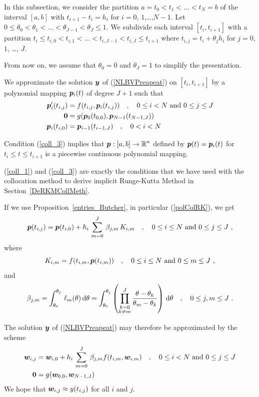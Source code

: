 In this subsection, we consider the partition
$a = t_0 < t_1 < \ldots < t_N = b$ of the interval $[a,b]$ with
$t_{i+1}-t_i = h_i$ for $i=0$, $1$,\ldots,$N-1$.  Let
$0 \leq \theta_0 < \theta_1 < \ldots < \theta_{J-1} < \theta_J
\leq 1$.  We subdivide each interval
$[t_i,t_{i+1}]$ with a partition
$t_i \leq t_{i,0} < t_{i,1} < \ldots < t_{i,J-1} < t_{i,J} \leq t_{i+1}$
where $t_{i,j} = t_i + \theta_jh_i$ for $j=0$, $1$, \ldots, $J$.

From now on, we assume that $\theta_0=0$ and $\theta_J=1$ to
simplify the presentation.

We approximate the solution $\bm{y}$ of (\ref{NLBVPreapeat}) on
$[t_i,t_{i+1}]$ by a polynomial mapping $\bm{p}_i(t)$ of degree
$J+1$ such that
\begin{align}
\bm{p}_i'(t_{i,j}) &= f(t_{i,j},\bm{p}_i(t_{i,j})) \quad ,
\quad 0 \leq i < N \ \text{and}\ 0 \leq j \leq J \label{coll_1} \\
\bm{0} &= g(\bm{p}_0(t_{0,0}),\bm{p}_{N-1}(t_{N-1,J})) \label{coll_2} \\
\bm{p}_i(t_{i,0}) &= \bm{p}_{i-1}(t_{i-1,J}) \quad , \quad
0 < i < N \label{coll_3}
\end{align}

Condition (\ref{coll_3}) implies that
$\displaystyle \bm{p}:[a,b]\to \mathbb{R}^n$ defined by
$\bm{p}(t) = \bm{p}_i(t)$ for $t_i \leq t \leq t_{i+1}$ is a
piecewise continuous polynomial mapping.

(\ref{coll_1}) and (\ref{coll_3}) are exactly the conditions that we
have used with the collocation method to derive implicit Runge-Kutta
Method in Section~\ref{DeRKMCollMeth}.

If we use Proposition~\ref{entries_Butcher}, in particular
(\ref{polColRK}), we get
\[
\VEC{p}(t_{i,j}) = \VEC{p}(t_{i,0}) + h_i\,\sum_{m=0}^J\, \beta_{j,m}\,K_{i,m}
\quad , \quad 0 \leq i \leq N \ \text{and} \ 0 \leq j \leq J \ ,
\]
where
\[
K_{i,m} = f(t_{i,m}, \bm{p}(t_{i,m})) \quad , \quad
0 \leq i \leq N \ \text{and} \ 0 \leq m \leq J \ ,  
\]
and
\[
\beta_{j,m} = \int_{\theta_0}^{\theta_j}\,\ell_m(\theta)\,\mathrm{d}\theta
= \int_{\theta_0}^{\theta_j}
\left(\prod_{\substack{k=0\\k\neq m}}^J\frac{\theta -
\theta_k}{\theta_m-\theta_k}\right) \,\mathrm{d}\theta
\quad , \quad  0\leq j,m \leq J \ .
\]

The solution $\bm{y}$ of (\ref{NLBVPreapeat}) may therefore be
approximated by the scheme
\begin{align}
\bm{w}_{i,j} &= \bm{w}_{i,0} + h_i \, \sum_{m=0}^J\,
\beta_{j,m}f(t_{i,m},\bm{w}_{i,m}) \quad , \quad
0 \leq i < N \ \text{and} \  0 \leq j \leq J
\label{FDM_RK_1} \\
\bm{0} &= g(\bm{w}_{0,0} ,\bm{w}_{N-1,J}) \label{FDM_RK_2}
\end{align}
We hope that $\bm{w}_{i,j}\approx y(t_{i,j})$ for all $i$ and
$j$.

